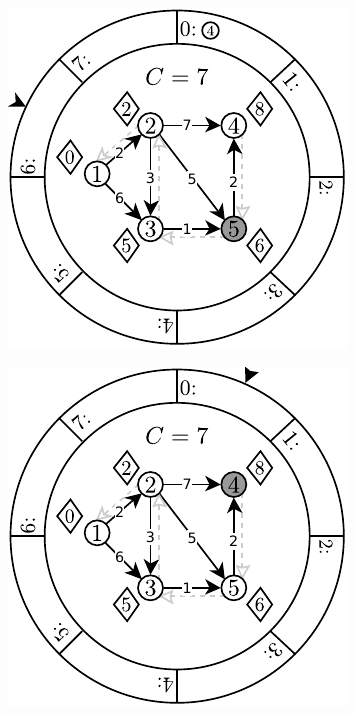 \begin{figure}[!htbp]
\begin{subfigure}[b]{0.3\textwidth}
		\caption{}
	\end{subfigure}
	\qquad
	\begin{subfigure}[b]{0.3\textwidth}
		\includegraphics[width=\textwidth]{Chapter_II/DIAL-Example/e.pdf}
		\caption{}
	\end{subfigure}
	\qquad
	\begin{subfigure}[b]{0.3\textwidth}
		\includegraphics[width=\textwidth]{Chapter_II/DIAL-Example/f.pdf}

\end{subfigure}
\end{figure}
